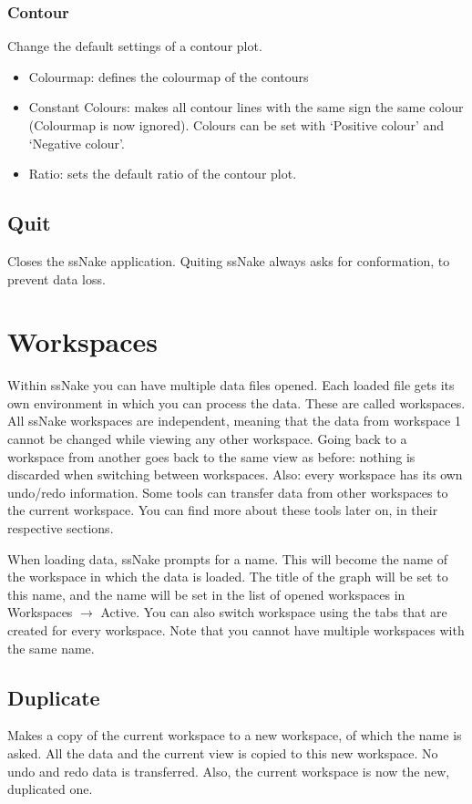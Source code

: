 \documentclass[11pt,a4paper]{article}
\begin{document}
\subsubsection{Contour}
Change the default settings of a contour plot.

\begin{itemize}
  \item Colourmap: defines the colourmap of the contours
  \item Constant Colours: makes all contour lines with the same sign the same colour (Colourmap is now
	 ignored). Colours can be set with `Positive colour' and `Negative colour'.
  \item Ratio: sets the default ratio of the contour plot.
\end{itemize}

\subsection{Quit}
Closes the ssNake application. Quiting ssNake always asks for conformation, to prevent data loss.

\section{Workspaces}
Within ssNake you can have multiple data files opened. Each loaded file gets its own environment in which you can process the data. These are called workspaces. All ssNake workspaces are independent, meaning that the data from workspace 1 cannot be changed while viewing any other workspace. Going back to a workspace from another goes back to the same view as before:  nothing is discarded when switching between workspaces. Also: every workspace has its own undo/redo information. Some tools can transfer data from other workspaces to the current workspace. You can find more about these tools later on, in their respective sections.

When loading data, ssNake prompts for a name. This will become the name of the workspace in which the data is loaded. The title of the graph will be set to this name, and the name will be set in the list of opened workspaces in Workspaces $\rightarrow$ Active. You can also switch workspace using the tabs that are created for every workspace. Note that you cannot have multiple workspaces with the same name.

\subsection{Duplicate}
Makes a copy of the current workspace to a new workspace, of which the name is asked. All the data and the current view is copied to this new workspace. No undo and redo data is transferred. Also, the current workspace is now the new, duplicated one.
\end{document}
